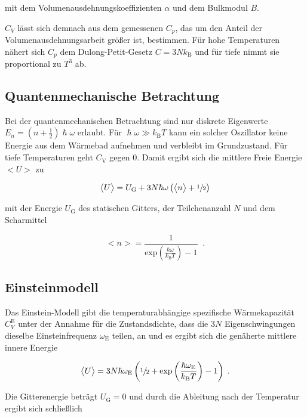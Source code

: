mit dem Volumenausdehnungskoeffizienten $\alpha$ und dem Bulkmodul $B$.

$C_V$ lässt sich demnach aus dem gemessenen $C_p$, das um den Anteil der Volumenausdehnungsarbeit größer ist, bestimmen.
Für hohe Temperaturen nähert sich $C_p$ dem Dulong-Petit-Gesetz $C = 3 N k_\text{B}$ und für tiefe nimmt sie proportional
zu $T^3$ ab.

\subsection{Quantenmechanische Betrachtung}

Bei der quantenmechanischen Betrachtung sind nur diskrete Eigenwerte $E_n = \left(n+\frac{1}{2}\right)\hslash \omega$
erlaubt. Für $\hslash \omega \gg k_\text{B} T$ kann ein solcher Oszillator keine Energie aus dem Wärmebad aufnehmen und 
verbleibt im Grundzustand. Für tiefe Temperaturen geht $C_\text{V}$ gegen $\num{0}$. 
Damit ergibt sich die mittlere Freie Energie $\bigl<U\bigr>$ zu

\begin{equation}
    \bigl<U\bigr> = U_\text{G} + 3N \hbar\omega \left(\bigl<n\bigr> + \sfrac{1}{2} \right) 
\end{equation}

mit der Energie $U_\text{G}$ des statischen Gitters, der Teilchenanzahl $N$ und dem Scharmittel

\begin{equation}
    \bigl<n\bigr> = \frac{1}{\text{exp}\left(\frac{\hbar \omega}{k_\text{B}T}\right)-1} \; \; .
\end{equation}

\subsection{Einsteinmodell}

Das Einstein-Modell gibt die temperaturabhängige spezifische Wärmekapazität $C_V^\text{E}$ unter der Annahme für die Zustandsdichte,
dass die $3N$ Eigenschwingungen dieselbe Einsteinfrequenz $\omega_\text{E}$ teilen, an und es ergibt sich die genäherte 
mittlere innere Energie

\begin{equation}
    \bigl<U\bigr> = 3N \hbar\omega_\text{E} \left(\sfrac{1}{2} + \text{exp}\left(\frac{\hbar \omega_\text{E}}{k_\text{B}T}\right)
     - 1\right) \; .
\end{equation}

Die  Gitterenergie beträgt $U_\text{G} = 0$ und durch die Ableitung nach der Temperatur ergibt sich schließlich

